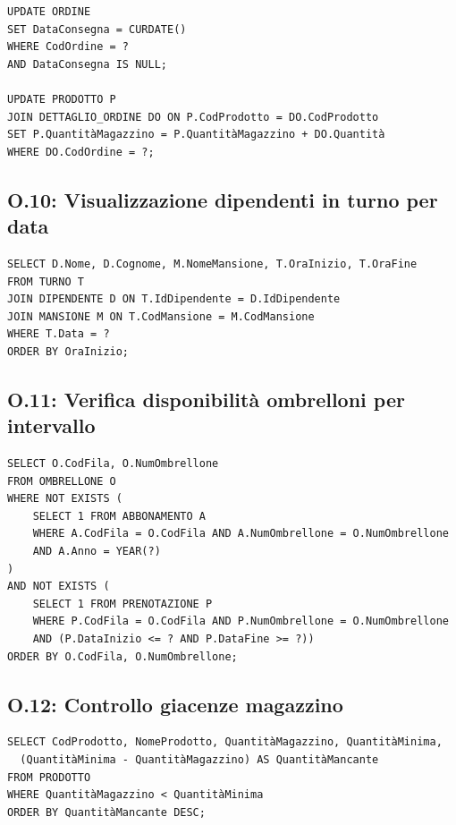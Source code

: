\begin{lstlisting}[caption={O.9: Registrazione consegna e aggiornamento giacenze}]
UPDATE ORDINE 
SET DataConsegna = CURDATE() 
WHERE CodOrdine = ?
AND DataConsegna IS NULL;

UPDATE PRODOTTO P
JOIN DETTAGLIO_ORDINE DO ON P.CodProdotto = DO.CodProdotto
SET P.QuantitàMagazzino = P.QuantitàMagazzino + DO.Quantità
WHERE DO.CodOrdine = ?;
\end{lstlisting}

\subsection*{O.10: Visualizzazione dipendenti in turno per data}

\begin{lstlisting}[caption={O.10: Visualizzazione dipendenti in turno per data}]
SELECT D.Nome, D.Cognome, M.NomeMansione, T.OraInizio, T.OraFine
FROM TURNO T
JOIN DIPENDENTE D ON T.IdDipendente = D.IdDipendente
JOIN MANSIONE M ON T.CodMansione = M.CodMansione
WHERE T.Data = ?
ORDER BY OraInizio;
\end{lstlisting}

\subsection*{O.11: Verifica disponibilità ombrelloni per intervallo}

\begin{lstlisting}[caption={O.11: Verifica disponibilità ombrelloni per intervallo}]
SELECT O.CodFila, O.NumOmbrellone
FROM OMBRELLONE O
WHERE NOT EXISTS (
    SELECT 1 FROM ABBONAMENTO A
    WHERE A.CodFila = O.CodFila AND A.NumOmbrellone = O.NumOmbrellone
    AND A.Anno = YEAR(?)
)
AND NOT EXISTS (
    SELECT 1 FROM PRENOTAZIONE P
    WHERE P.CodFila = O.CodFila AND P.NumOmbrellone = O.NumOmbrellone
    AND (P.DataInizio <= ? AND P.DataFine >= ?))
ORDER BY O.CodFila, O.NumOmbrellone;
\end{lstlisting}

\clearpage

\subsection*{O.12: Controllo giacenze magazzino}

\begin{lstlisting}[caption={O.12: Controllo giacenze magazzino}]
SELECT CodProdotto, NomeProdotto, QuantitàMagazzino, QuantitàMinima,
  (QuantitàMinima - QuantitàMagazzino) AS QuantitàMancante
FROM PRODOTTO
WHERE QuantitàMagazzino < QuantitàMinima
ORDER BY QuantitàMancante DESC;
\end{lstlisting}

